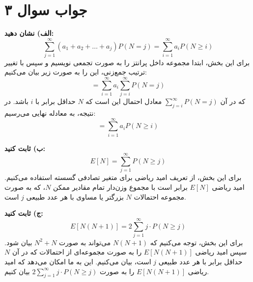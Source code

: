 \section*{جواب سوال ۳}

\textbf{الف) نشان دهید:} 
\[ \sum_{j=1}^{\infty} (a_1 + a_2 + \ldots + a_j) P(N = j) = \sum_{i=1}^{\infty} a_i P(N \geq i) \]
برای این بخش، ابتدا مجموعه داخل پرانتز را به صورت تجمعی نویسیم و سپس با تغییر ترتیب جمع‌زنی، این را به صورت زیر بیان می‌کنیم:
\[ = \sum_{i=1}^{\infty} a_i \sum_{j=i}^{\infty} P(N = j) \]
که در آن \(\sum_{j=i}^{\infty} P(N = j)\) معادل احتمال این است که \(N\) حداقل برابر با \(i\) باشد. در نتیجه، به معادله نهایی می‌رسیم:
\[ = \sum_{i=1}^{\infty} a_i P(N \geq i) \]

\textbf{ب) ثابت کنید:} 
\[ E[N] = \sum_{j=1}^{\infty} P(N \geq j) \]
برای این بخش، از تعریف امید ریاضی برای متغیر تصادفی گسسته استفاده می‌کنیم. امید ریاضی \(E[N]\) برابر است با مجموع وزن‌دار تمام مقادیر ممکن \(N\)، که به صورت مجموعه احتمالات \(N\) بزرگتر یا مساوی با هر عدد طبیعی \(j\) است.

\textbf{ج) ثابت کنید:} 
\[ E[N(N + 1)] = 2 \sum_{j=1}^{\infty} j \cdot P(N \geq j) \]
برای این بخش، توجه می‌کنیم که \(N(N + 1)\) می‌تواند به صورت \(N^2 + N\) بیان شود. سپس امید ریاضی \(E[N(N + 1)]\) را به صورت مجموعه‌ای از احتمالات که در آن \(N\) حداقل برابر با هر عدد طبیعی \(j\) است، بیان می‌کنیم. این به ما امکان می‌دهد که امید ریاضی \(E[N(N + 1)]\) را به صورت \(2 \sum_{j=1}^{\infty} j \cdot P(N \geq j)\) بیان کنیم.